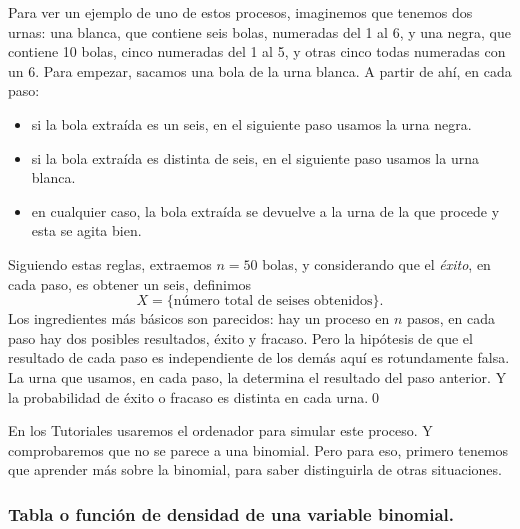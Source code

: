 \begin{ejemplo}
\label{cap05:ejem:ProcesoNoBinomial}
    Para ver un ejemplo de uno de estos procesos, imaginemos que tenemos dos urnas: una blanca, que contiene seis bolas, numeradas del 1 al 6, y una negra, que contiene 10 bolas, cinco numeradas del 1 al 5, y otras cinco todas numeradas con un 6. Para empezar, sacamos una bola de la urna blanca. A partir de ahí, en cada paso:
      \begin{itemize}
        \item si la bola extraída es un seis, en el siguiente paso usamos la urna negra.
        \item si la bola extraída es distinta de seis, en el siguiente paso usamos la urna blanca.
        \item en cualquier caso, la bola extraída se devuelve a la urna de la que procede y esta se agita bien.
      \end{itemize}
    Siguiendo estas reglas, extraemos $n=50$ bolas, y considerando que el {\em éxito}, en cada paso, es obtener un seis, definimos
        \[X=\{\mbox{número total de seises obtenidos}\}.\]
    Los ingredientes más básicos son parecidos: hay un proceso en $n$ pasos, en cada paso hay dos posibles resultados, éxito y fracaso. Pero la hipótesis de que el resultado de cada paso es independiente de los demás aquí es rotundamente falsa. La urna que usamos, en cada paso, la determina el resultado del paso anterior. Y la probabilidad de éxito o fracaso es distinta en cada urna.\qed
\end{ejemplo}
En los Tutoriales usaremos el ordenador para simular este proceso. Y comprobaremos que no se parece a una binomial. Pero para eso, primero tenemos que aprender más sobre la binomial, para saber distinguirla de otras situaciones.


\subsubsection*{Tabla o función de densidad de una variable binomial.}
\label{cap05:subsubsec:tablaFuncionDensidadBinomial}

